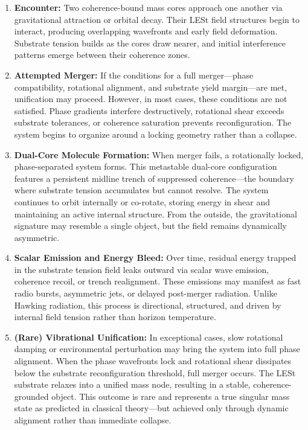 \documentclass[sn-mathphys]{sn-jnl}
\theoremstyle{thmstyleone}%
\theoremstyle{thmstyletwo}%
\theoremstyle{thmstylethree}%
\begin{document}
\begin{enumerate}
\item \textbf{Encounter:}  
Two coherence-bound mass cores approach one another via gravitational attraction or orbital decay. Their LESt field structures begin to interact, producing overlapping wavefronts and early field deformation. Substrate tension builds as the cores draw nearer, and initial interference patterns emerge between their coherence zones.

\item \textbf{Attempted Merger:}  
If the conditions for a full merger—phase compatibility, rotational alignment, and substrate yield margin—are met, unification may proceed. However, in most cases, these conditions are not satisfied. Phase gradients interfere destructively, rotational shear exceeds substrate tolerances, or coherence saturation prevents reconfiguration. The system begins to organize around a locking geometry rather than a collapse.

\item \textbf{Dual-Core Molecule Formation:}  
When merger fails, a rotationally locked, phase-separated system forms. This metastable dual-core configuration features a persistent midline trench of suppressed coherence—the boundary where substrate tension accumulates but cannot resolve. The system continues to orbit internally or co-rotate, storing energy in shear and maintaining an active internal structure. From the outside, the gravitational signature may resemble a single object, but the field remains dynamically asymmetric.

\item \textbf{Scalar Emission and Energy Bleed:}  
Over time, residual energy trapped in the substrate tension field leaks outward via scalar wave emission, coherence recoil, or trench realignment. These emissions may manifest as fast radio bursts, asymmetric jets, or delayed post-merger radiation. Unlike Hawking radiation, this process is directional, structured, and driven by internal field tension rather than horizon temperature.

\item \textbf{(Rare) Vibrational Unification:}  
In exceptional cases, slow rotational damping or environmental perturbation may bring the system into full phase alignment. When the phase wavefronts lock and rotational shear dissipates below the substrate reconfiguration threshold, full merger occurs. The LESt substrate relaxes into a unified mass node, resulting in a stable, coherence-grounded object. This outcome is rare and represents a true singular mass state as predicted in classical theory—but achieved only through dynamic alignment rather than immediate collapse.
\end{enumerate}
\end{document}
